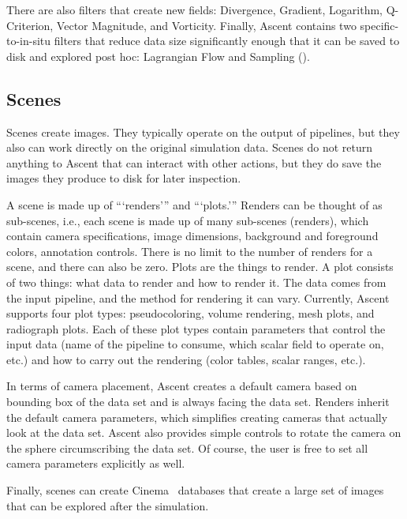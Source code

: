 There are also filters that create new fields: Divergence, Gradient, Logarithm, Q-Criterion, Vector Magnitude, and Vorticity.
%
Finally, Ascent contains two specific-to-in-situ filters that
reduce data size significantly enough that it can be saved to disk and explored post hoc:
Lagrangian Flow and Sampling ().


\subsection{Scenes}

Scenes create images. 
%
They typically operate on the output of pipelines, but they also can work directly
on the original simulation data.
%
Scenes do not return anything to Ascent that can interact with other actions, but they
do save the images they produce to disk for later inspection.

A scene is made up of ```renders''' and ```plots.'''
%
Renders can be thought of as sub-scenes, i.e., each scene is made up of many sub-scenes (renders),
which contain
camera specifications, image dimensions, background and
foreground colors, annotation controls.
%
There is no limit to the number of renders for a scene, and there can also be zero.
%
Plots are the things to render.  
%
A plot consists of two things: what data to render and how to render it.
%
The data comes from the input pipeline, and the method for rendering it can vary.
%
Currently, Ascent supports four plot types: pseudocoloring, volume rendering, mesh plots, 
and radiograph plots.  
%
Each of these plot types contain parameters that control the input data
(name of the pipeline to consume, which scalar field to operate on, etc.)
and how to carry out the rendering (color tables, scalar ranges, etc.).
%

In terms of camera placement, 
Ascent creates a default camera based on bounding box of the data set and
is always facing the data set.
%
Renders inherit the default camera parameters, which simplifies creating
cameras that actually look at the data set.
%
Ascent also provides simple controls to rotate the camera on the
sphere circumscribing the data set. 
%
Of course, the user is free to set all
camera parameters explicitly as well.

Finally, scenes can create Cinema~\cite{AhrensCinema} databases that
create a large set of images that can be explored after the simulation.


